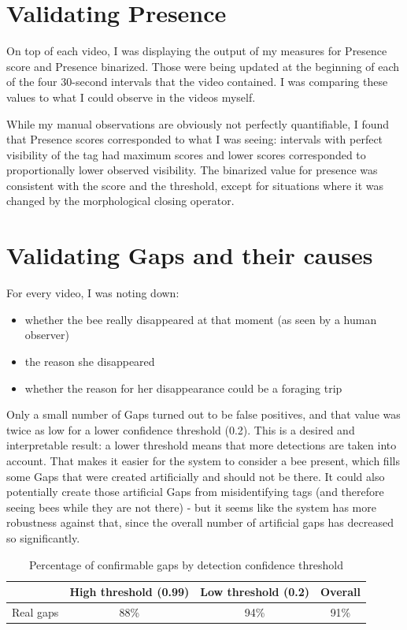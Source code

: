\section{Validating Presence}

On top of each video, I was displaying the output of my measures for Presence score and Presence binarized. Those were being updated at the beginning of each of the four 30-second intervals that the video contained. I was comparing these values to what I could observe in the videos myself. 

While my manual observations are obviously not perfectly quantifiable, I found that Presence scores corresponded to what I was seeing: intervals with perfect visibility of the tag had maximum scores and lower scores corresponded to proportionally lower observed visibility. The binarized value for presence was consistent with the score and the threshold, except for situations where it was changed by the morphological closing operator.


\section{Validating Gaps and their causes}


For every video, I was noting down:

\begin{itemize}
\item whether the bee really disappeared at that moment (as seen by a human observer)
\item the reason she disappeared 
\item whether the reason for her disappearance could be a foraging trip
\end{itemize}

Only a small number of Gaps turned out to be false positives, and that value was twice as low for a lower confidence threshold (0.2). This is a desired and interpretable result: a lower threshold means that more detections are taken into account. That makes it easier for the system to consider a bee present, which fills some Gaps that were created artificially and should not be there. It could also potentially create those artificial Gaps from misidentifying tags (and therefore seeing bees while they are not there) - but it seems like the system has more robustness against that, since the overall number of artificial gaps has decreased so significantly.

\begin{table}[h]
    \caption{Percentage of confirmable gaps by detection confidence threshold}
    \centering
    \label{table:conf_comparison}
    \begin{tabular}{@{}lccc@{}}
        \toprule
                       & High threshold (0.99) & Low threshold (0.2)  & Overall \\ \midrule
        Real gaps      & 88\%                & 94\%                  & 91\%    
    \end{tabular}
\end{table}

